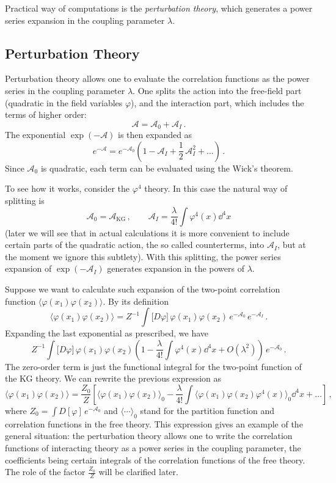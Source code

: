 Practical way of computations is the \emph{perturbation theory}, which
generates a power series expansion in the coupling parameter $\lambda$.

\subsection*{Perturbation Theory}

Perturbation theory allows one to evaluate the correlation functions as the
power series in the coupling parameter $\lambda$. One splits the action into
the free-field part (quadratic in the field variables $\varphi$), and the
interaction part, which includes the terms of higher order:
\[
\mathcal A=\mathcal A_0+\mathcal A_I\,.
\]
The exponential $\exp(-\mathcal A)$ is then expanded as
\[
e^{-\mathcal A}=e^{-\mathcal A_0}\left(1-\mathcal A_I+\frac12\,\mathcal A_I^2+\dots\right)\,.
\]
Since $\mathcal A_0$ is quadratic, each term can be evaluated using the Wick's
theorem.

To see how it works, consider the $\varphi^4$ theory. In this case the natural
way of splitting is
\[
\mathcal A_0=\mathcal A_{\mathrm{KG}}\,,\qquad \mathcal A_I=\frac{\lambda}{4!}\int\varphi^4(x)\dd^4x
\]
(later we will see that in actual calculations it is more convenient to include
certain parts of the quadratic action, the so called counterterms, into
$\mathcal A_I$, but at the moment we ignore this subtlety). With this
splitting, the power series expansion of $\exp(-\mathcal A_I)$ generates
expansion in the powers of $\lambda$.

Suppose we want to calculate such expansion of the two-point correlation
function $\langle\varphi(x_1)\varphi(x_2)\rangle$. By its definition
\[
\bigl\langle\varphi(x_1)\varphi(x_2)\bigr\rangle=Z^{-1}\int\bigl[D\varphi\bigr]\,\varphi(x_1)\varphi(x_2)\,e^{-\mathcal A_0}\,e^{-\mathcal A_I}\,.
\]
Expanding the last exponential as prescribed, we have
\[
Z^{-1}\int\bigl[D\varphi\bigr]\,\varphi(x_1)\varphi(x_2)\left(1-\frac{\lambda}{4!}\int\varphi^4(x)\dd^4x+O(\lambda^2)\right)\,e^{-\mathcal A_0}\,.
\]
The zero-order term is just the functional integral for the two-point function
of the KG theory. We can rewrite the previous expression as
\begin{equation}\label{eq:pt2}
\bigl\langle\varphi(x_1)\varphi(x_2)\bigr\rangle=\frac{Z_0}{Z}\left[\bigl\langle\varphi(x_1)\varphi(x_2)\bigr\rangle_0
-\frac{\lambda}{4!}\int\bigl\langle\varphi(x_1)\varphi(x_2)\varphi^4(x)\bigr\rangle_0\dd^4x+\dots\right]\,,
\end{equation}
where $Z_0=\int D[\varphi]\,e^{-\mathcal A_0}$ and $\langle\cdots\rangle_0$
stand for the partition function and correlation functions in the free theory.
This expression gives an example of the general situation: the perturbation
theory allows one to write the correlation functions of interacting theory as a
power series in the coupling parameter, the coefficients being certain
integrals of the correlation functions of the free theory. The role of the
factor $\frac{Z_0}{Z}$ will be clarified later.

